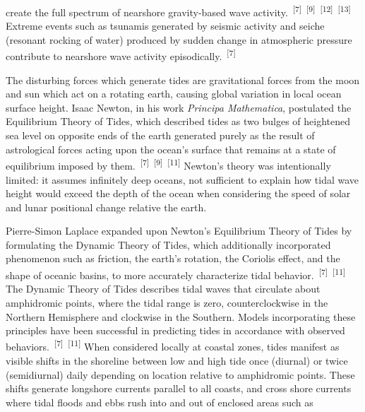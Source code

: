 \documentclass{article}
\begin{document}
\newpage
{}
\fancyfoot[C]{\thepage} 
\thispagestyle{fancy}

\par{\noindent create the full spectrum of nearshore gravity-based wave activity.~\textsuperscript{[7]}~\textsuperscript{[9]}~\textsuperscript{[12]}~\textsuperscript{[13]} Extreme events such as tsunamis generated by seismic activity and seiche (resonant rocking of water) produced by sudden change in atmospheric pressure contribute to nearshore wave activity episodically.~\textsuperscript{[7]}}

\par{The disturbing forces which generate tides are gravitational forces from the moon and sun which act on a rotating earth, causing global variation in local ocean surface height. Isaac Newton, in his work \textit{Principa Mathematica}, postulated the Equilibrium Theory of Tides, which described tides as two bulges of heightened sea level on opposite ends of the earth generated purely as the result of astrological forces acting upon the ocean's surface that remains at a state of equilibrium imposed by them.~\textsuperscript{[7]}~\textsuperscript{[9]}~\textsuperscript{[11]} Newton's theory was intentionally limited: it assumes infinitely deep oceans, not sufficient to explain how tidal wave height would exceed the depth of the ocean when considering the speed of solar and lunar positional change relative the earth.}

\par{Pierre-Simon Laplace expanded upon Newton's Equilibrium Theory of Tides by formulating the Dynamic Theory of Tides, which additionally incorporated phenomenon such as friction, the earth's rotation, the Coriolis effect, and the shape of oceanic basins, to more accurately characterize tidal behavior.~\textsuperscript{[7]}~\textsuperscript{[11]} The Dynamic Theory of Tides describes tidal waves that circulate about amphidromic points, where the tidal range is zero, counterclockwise in the Northern Hemisphere and clockwise in the Southern. Models incorporating these principles have been successful in predicting tides in accordance with observed behaviors.~\textsuperscript{[7]}~\textsuperscript{[11]}  When considered locally at coastal zones, tides manifest as visible shifts in the shoreline between low and high tide once (diurnal) or twice (semidiurnal) daily depending on location relative to amphidromic points. These shifts generate longshore currents parallel to all coasts, and cross shore currents where tidal floods and ebbs rush into and out of enclosed areas such as}
\end{document}
